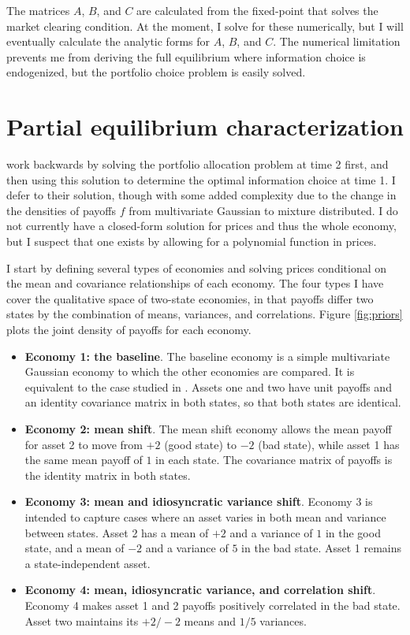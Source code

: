 \documentclass{article}
\begin{document}
\noindent The matrices $A$, $B$, and $C$ are calculated from the fixed-point that solves the market clearing condition. At the moment, I solve for these numerically, but I will eventually calculate the analytic forms for $A$, $B$, and $C$. The numerical limitation prevents me from deriving the full equilibrium where information choice is endogenized, but the portfolio choice problem is easily solved.

\section{Partial equilibrium characterization}\label{sec:peq}

\textcite{kacperczyk_rational_2016} work backwards by solving the portfolio allocation problem at time 2 first, and then using this solution to determine the optimal information choice at time 1. I defer to their solution, though with some added complexity due to the change in the densities of payoffs $f$ from multivariate Gaussian to mixture distributed. I do not currently have a closed-form solution for prices and thus the whole economy, but I suspect that one exists by allowing for a polynomial function in prices.

I start by defining several types of economies and solving prices conditional on the mean and covariance relationships of each economy. The four types I have cover the qualitative space of two-state economies, in that payoffs differ two states by the combination of means, variances, and correlations. Figure \ref{fig:priors} plots the joint density of payoffs for each economy.

\begin{itemize}
    \item \textbf{Economy 1: the baseline}. The baseline economy is a simple multivariate Gaussian economy to which the other economies are compared. It is equivalent to the case studied in \textcite{kacperczyk_rational_2016}. Assets one and two have unit payoffs and an identity covariance matrix in both states, so that both states are identical.
    
    \item \textbf{Economy 2: mean shift}. The mean shift economy allows the mean payoff for asset 2 to move from $+2$ (good state) to $-2$ (bad state), while asset 1 has the same mean payoff of $1$ in each state. The covariance matrix of payoffs is the identity matrix in both states.

    \item \textbf{Economy 3: mean and idiosyncratic variance shift}. Economy 3 is intended to capture cases where an asset varies in both mean and variance between states. Asset 2 has a mean of $+2$ and a variance of $1$ in the good state, and a mean of $-2$ and a variance of $5$ in the bad state. Asset 1 remains a state-independent asset.
    
    \item \textbf{Economy 4: mean, idiosyncratic variance, and correlation shift}. Economy 4 makes asset 1 and 2 payoffs positively correlated in the bad state. Asset two maintains its $+2/-2$ means and $1/5$ variances.
\end{itemize}
    
\end{document}

